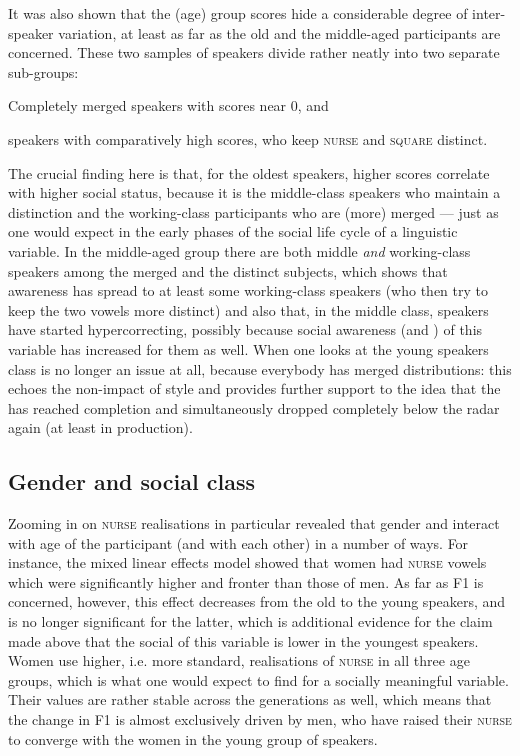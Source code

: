 It was also shown that the (age) group  scores hide a considerable degree of inter-speaker variation, at least as far as the old and the middle-aged participants are concerned.
These two samples of speakers divide rather neatly into two separate sub-groups:
\begin{inparaenum}[(1)]
	\item Completely merged speakers with  scores near 0, and
	\item speakers with comparatively high  scores, who keep \textsc{nurse} and \textsc{square} distinct.
\end{inparaenum}
The crucial finding here is that, for the oldest speakers, higher  scores correlate with higher social status, because it is the middle-class speakers who maintain a distinction and the working-class participants who are (more) merged --- just as one would expect in the early phases of the social life cycle of a linguistic variable.
In the middle-aged group there are both middle \emph{and} working-class speakers among the merged and the distinct subjects, which shows that awareness has spread to at least some working-class speakers (who then try to keep the two vowels more distinct) and also that, in the middle class, speakers have started hypercorrecting, possibly because social awareness (and ) of this variable has increased for them as well.
When one looks at the young speakers class is no longer an issue at all, because everybody has merged distributions: this echoes the non-impact of style and provides further support to the idea that the  has reached completion and simultaneously dropped completely below the radar again (at least in production).

\subsection{Gender and social class}
\label{prod.disc.nurse.social}

Zooming in on \textsc{nurse} realisations in particular revealed that gender and  interact with age of the participant (and with each other) in a number of ways.
For instance, the mixed linear effects model showed that women had \textsc{nurse} vowels which were significantly higher and fronter than those of men.
As far as F1 is concerned, however, this effect decreases from the old to the young speakers, and is no longer significant for the latter, which is additional evidence for the claim made above that the social  of this variable is lower in the youngest speakers.
Women use higher, i.e. more standard, realisations of \textsc{nurse} in all three age groups, which is what one would expect to find for a socially meaningful variable.
Their values are rather stable across the generations as well, which means that the  change in F1 is almost exclusively driven by men, who have raised their \textsc{nurse} to converge with the women in the young group of speakers.

